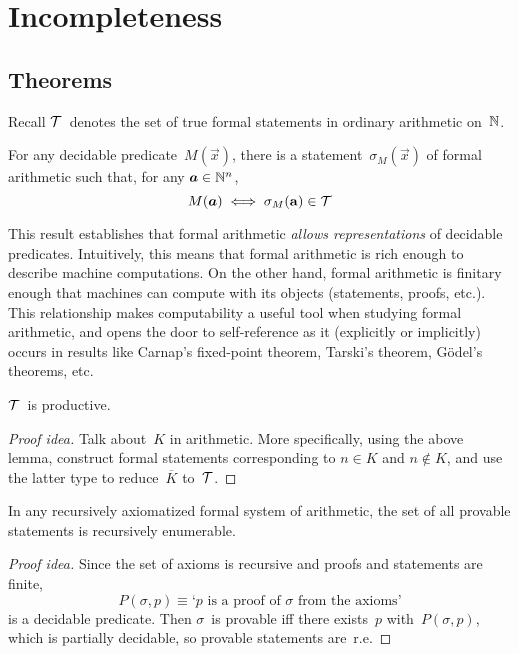 %
%
%
\section{Incompleteness}
\subsection*{Theorems}
\noindent Recall \(\mathcal{T}\)~denotes the set of true formal statements in ordinary arithmetic on~\(\mathbb{N}\).

\begin{lem}[Representations]
For any decidable predicate~\(M(\vec{x})\), there is a statement~\(\sigma_M(\vec{x})\) of formal arithmetic such that, for any \(\boldsymbol{a}\in\mathbb{N}^n\),
\[M(\boldsymbol{a})\iff\sigma_M(\boldsymbol{\mathbf{a}})\in\mathcal{T}\]
\end{lem}
\begin{app}
This result establishes that formal arithmetic \emph{allows representations} of decidable predicates. Intuitively, this means that formal arithmetic is rich enough to describe machine computations. On the other hand, formal arithmetic is finitary enough that machines can compute with its objects (statements, proofs, etc.). This relationship makes computability a useful tool when studying formal arithmetic, and opens the door to self-reference as it (explicitly or implicitly) occurs in results like Carnap's fixed-point theorem, Tarski's theorem, G\"odel's theorems, etc.
\end{app}

\begin{thm}
\(\mathcal{T}\)~is productive.
\end{thm}
\begin{proof}[Proof idea]
Talk about~\(K\) in arithmetic. More specifically, using the above lemma, construct formal statements corresponding to \(n\in K\) and \(n\not\in K\), and use the latter type to reduce~\(\overline{K}\) to~\(\mathcal{T}\).
\end{proof}

\begin{lem}
In any recursively axiomatized formal system of arithmetic, the set of all provable statements is recursively enumerable.
\end{lem}
\begin{proof}[Proof idea]
Since the set of axioms is recursive and proofs and statements are finite,
\[P(\sigma,p)\equiv\text{`}p\text{ is a proof of }\sigma\text{ from the axioms'}\]
is a decidable predicate. Then \(\sigma\)~is provable iff there exists~\(p\) with~\(P(\sigma,p)\), which is partially decidable, so provable statements are~r.e.
\end{proof}

